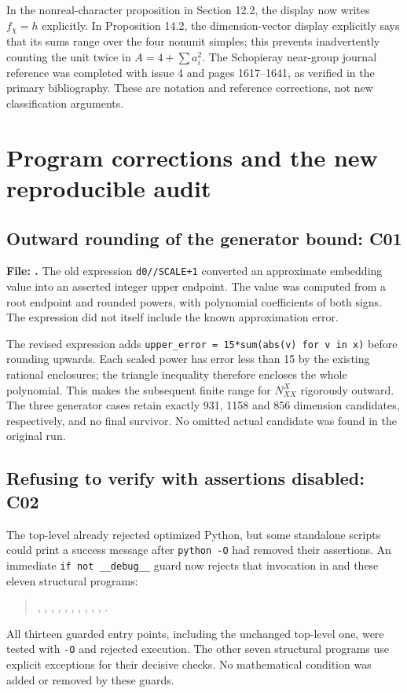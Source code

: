 \documentclass[11pt,a4paper]{article}
\begin{document}
In the nonreal-character proposition in Section 12.2, the display now
writes $f_\chi=h$ explicitly. In Proposition 14.2, the dimension-vector
display explicitly says that its sums range over the four nonunit
simples; this prevents inadvertently counting the unit twice in
$A=4+\sum a_i^2$. The Schopieray near-group journal reference was
completed with issue 4 and pages 1617--1641, as verified in the primary
bibliography. These are notation and reference corrections, not new
classification arguments.

\section{Program corrections and the new reproducible audit}

\subsection{Outward rounding of the generator bound: C01}

\textbf{File: .}
The old expression \texttt{d0//SCALE+1} converted an approximate
embedding value into an asserted integer upper endpoint. The value was
computed from a root endpoint and rounded powers, with polynomial
coefficients of both signs. The expression did not itself include the
known approximation error.

The revised expression adds
\texttt{upper\_error = 15*sum(abs(v) for v in x)} before rounding
upwards. Each scaled power has error less than 15 by the existing
rational enclosures; the triangle inequality therefore encloses the
whole polynomial. This makes the subsequent finite range for
$N_{XX}^X$ rigorously outward. The three generator cases retain exactly
931, 1158 and 856 dimension candidates, respectively, and no final
survivor. No omitted actual candidate was found in the original run.

\subsection{Refusing to verify with assertions disabled: C02}

The top-level  already rejected optimized Python, but
some standalone scripts could print a success message after
\texttt{python -O} had removed their assertions. An immediate
\texttt{if not \_\_debug\_\_} guard now rejects that invocation in
 and these eleven structural programs:
\begin{quote}\small\raggedright
{}, ,
, ,
, ,
, ,
, ,
.
\end{quote}
All thirteen guarded entry points, including the unchanged top-level
one, were tested with \texttt{-O} and rejected execution. The other seven
structural programs use explicit exceptions for their decisive checks.
No mathematical condition was added or removed by these guards.
\end{document}
